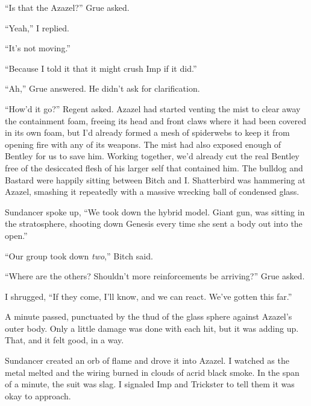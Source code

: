 ``Is that the Azazel?''  Grue asked.



``Yeah,'' I replied.



``It's not moving.''



``Because I told it that it might crush Imp if it did.''



``Ah,'' Grue answered.  He didn't ask for clarification.



``How'd it go?''  Regent asked.  Azazel had started venting the mist to clear away the containment foam, freeing its head and front claws where it had been covered in its own foam, but I'd already formed a mesh of spiderwebs to keep it from opening fire with any of its weapons.  The mist had also exposed enough of Bentley for us to save him.  Working together, we'd already cut the real Bentley free of the desiccated flesh of his larger self that contained him.  The bulldog and Bastard were happily sitting between Bitch and I.  Shatterbird was hammering at Azazel, smashing it repeatedly with a massive wrecking ball of condensed glass.



Sundancer spoke up, ``We took down the hybrid model.  Giant gun, was sitting in the stratosphere, shooting down Genesis every time she sent a body out into the open.''



``Our group took down \emph{two},'' Bitch said.



``Where are the others?  Shouldn't more reinforcements be arriving?''  Grue asked.



I shrugged, ``If they come, I'll know, and we can react.  We've gotten this far.''



A minute passed, punctuated by the thud of the glass sphere against Azazel's outer body. Only a little damage was done with each hit, but it was adding up.  That, and it felt good, in a way.



Sundancer created an orb of flame and drove it into Azazel.  I watched as the metal melted and the wiring burned in clouds of acrid black smoke.  In the span of a minute, the suit was slag.  I signaled Imp and Trickster to tell them it was okay to approach.



